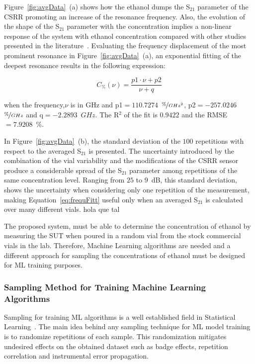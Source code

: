 \documentclass[journal,twoside,web]{ieeecolor}
\begin{document}
Figure~\ref{fig:avgData}~(a) shows how the ethanol dumps the S$_{21}$ parameter of the CSRR promoting an increase of the resonance frequency. Also, the evolution of the shape of the S$_{21}$ parameter with the concentration implies a non-linear response of the system with ethanol concentration compared with other studies presented in the literature~\cite{Abdolrazzaghi2023}. Evaluating the frequency displacement of the most prominent resonance in Figure~\ref{fig:avgData}~(a), an exponential fitting of the deepest resonance results in the following expression:

\begin{equation}
	\label{eq:frequFitt}
	 C_{\%}(\nu) = \frac{p1\cdot\nu+p2}{\nu+q} 
\end{equation} 

when the frequency,$\nu$ is in GHz and p1$=110.7274$~$\nicefrac{\%}{GHz^{2}}$, p2$=-257.0246$~$\nicefrac{\%}{GHz}$ and q$=-2.2893$~$GHz$. The R$^{2}$ of the fit is $0.9422$ and the RMSE$=7.9208$~$\%$. 
  
In Figure~\ref{fig:avgData}~(b), the standard deviation of the $100$ repetitions with respect to the averaged S$_{21}$ is presented. The uncertainty introduced by the combination of the vial variability and the modifications of the CSRR sensor produce a considerable spread of the S$_{21}$ parameter among repetitions of the same concentration level. Ranging from $25$ to $9$~dB, this standard deviation, shows the uncertainty when considering only one repetition of the measurement, making Equation~\ref{eq:frequFitt} useful only when an averaged S$_{21}$ is calculated over many different vials. hola que tal

The proposed system, must be able to determine the concentration of ethanol by measuring the SUT when poured in a random vial from the stock commercial vials in the lab. Therefore, Machine Learning algorithms are needed and a different approach for sampling the concentrations of ethanol must be designed for ML training purposes.
\\
\subsubsection{Sampling Method for Training Machine Learning Algorithms}
\label{sssec:samplingML}

Sampling for training ML algorithms is a well established field in Statistical Learning~\cite{Wu2020}. The main idea behind any sampling technique for ML model training is to randomize repetitions of each sample. This randomization mitigates undesired effects on the obtained dataset such as badge effects, repetition correlation and instrumental error propagation. 
\end{document}
